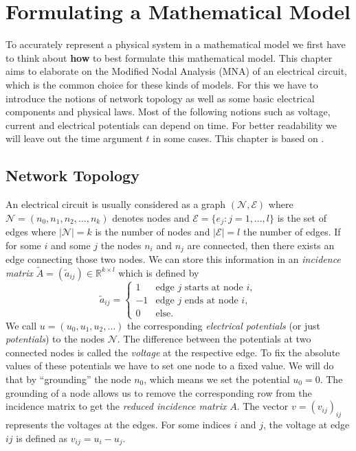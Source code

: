 \chapter{Formulating a Mathematical Model}
\label{sec:formulating a mathematical model}

To accurately represent a physical system in a mathematical model we first have to think about \textbf{how} to best formulate this mathematical model.
This chapter aims to elaborate on the Modified Nodal Analysis (MNA) of an electrical circuit, which is the common choice for these kinds of models. For this we have to introduce the notions of network topology as well as some basic electrical components and physical laws. Most of the following notions such as voltage, current and electrical potentials can depend on time. For better readability we will leave out the time argument $t$ in some cases. This chapter is based on \cite{ModellingAndDiscretizationOfCircuitProblems}.

\section{Network Topology}
\label{Sec:Network Topology}
An electrical circuit is usually considered as a graph $(\mathcal{N},\mathcal{E})$ where $\mathcal{N} = (n_0, n_1, n_2, ..., n_k)$ denotes nodes and $\mathcal{E} = \{e_{j}: j = 1,...,l\}$ is the set of edges where $|\mathcal{N}| = k$ is the number of nodes and $|\mathcal{E}| = l$ the number of edges. If for some $i$ and some $j$ the nodes $n_i$ and  $n_j$ are connected, then there exists an edge connecting those two nodes.
We can store this information in an \emph{incidence matrix} $\tilde{A} = (\tilde{a}_{ij}) \in \mathbb{R}^{k \times l}$ which is defined by
\begin{displaymath}
	\tilde{a}_{ij} = 
	\begin{cases}
		1 &   \text{edge $j$ starts at node $i$},\\
		-1 &  \text{edge $j$  ends at node $i$},\\
		0 & \text{else}.				
	\end{cases}
\end{displaymath}
We call $u = (u_0, u_1, u_2, ...)$ the corresponding \emph{electrical potentials} (or just \emph{potentials}) to the nodes $\mathcal{N}$. The difference between the potentials at two connected nodes is called the \emph{voltage} at the respective edge. To fix the absolute values of these potentials we have to set one node to a fixed value. We will do that by ``grounding'' the node $n_0$, which means we set the potential $u_0 = 0$. The grounding of a node allows us to remove the corresponding row from the incidence matrix to get the \emph{reduced incidence matrix} $A$. The vector $v = (v_{ij})_{ij}$ represents the voltages at the edges. For some indices $i$ and $j$, the voltage at edge $ij$ is defined as $v_{ij} = u_i - u_j$.


